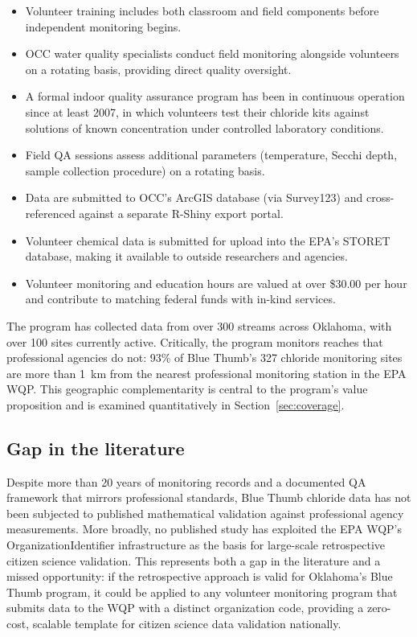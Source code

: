 \documentclass[lineno]{wlpeerj}
\begin{document}
\begin{itemize}
  \item Volunteer training includes both classroom and field components before independent monitoring begins.
  \item OCC water quality specialists conduct field monitoring alongside volunteers on a rotating basis, providing direct quality oversight.
  \item A formal indoor quality assurance program has been in continuous operation since at least 2007, in which volunteers test their chloride kits against solutions of known concentration under controlled laboratory conditions.
  \item Field QA sessions assess additional parameters (temperature, Secchi depth, sample collection procedure) on a rotating basis.
  \item Data are submitted to OCC's ArcGIS database (via Survey123) and cross-referenced against a separate R-Shiny export portal.
  \item Volunteer chemical data is submitted for upload into the EPA's STORET database, making it available to outside researchers and agencies.
  \item Volunteer monitoring and education hours are valued at over \$30.00 per hour and contribute to matching federal funds with in-kind services.
\end{itemize}

The program has collected data from over 300 streams across Oklahoma, with over 100 sites currently active. Critically, the program monitors reaches that professional agencies do not: 93\% of Blue Thumb's 327 chloride monitoring sites are more than 1~km from the nearest professional monitoring station in the EPA WQP. This geographic complementarity is central to the program's value proposition and is examined quantitatively in Section~\ref{sec:coverage}.

\subsection{Gap in the literature}

Despite more than 20 years of monitoring records and a documented QA framework that mirrors professional standards, Blue Thumb chloride data has not been subjected to published mathematical validation against professional agency measurements. More broadly, no published study has exploited the EPA WQP's OrganizationIdentifier infrastructure as the basis for large-scale retrospective citizen science validation. This represents both a gap in the literature and a missed opportunity: if the retrospective approach is valid for Oklahoma's Blue Thumb program, it could be applied to any volunteer monitoring program that submits data to the WQP with a distinct organization code, providing a zero-cost, scalable template for citizen science data validation nationally.
\end{document}
